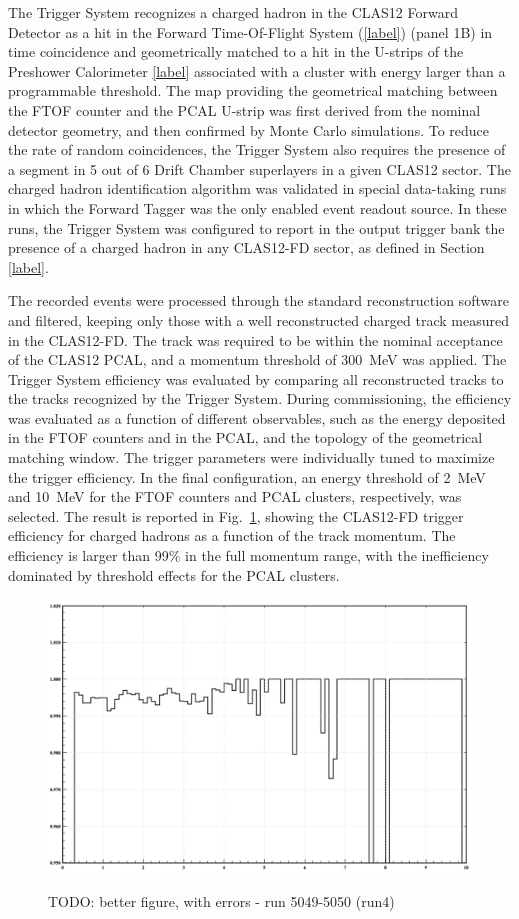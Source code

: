 The Trigger System recognizes a charged hadron in the CLAS12 Forward Detector as a hit in the Forward Time-Of-Flight System (\ref{label}) (panel 1B) in time coincidence and geometrically matched to a hit in the U-strips of the Preshower Calorimeter \ref{label} associated with a cluster with energy larger than a programmable threshold. The map providing the geometrical matching between the FTOF counter and the PCAL U-strip was first derived from the nominal detector geometry, and then confirmed by Monte Carlo simulations. To reduce the rate of random coincidences, the Trigger System also requires the presence of a segment in 5 out of 6 Drift Chamber superlayers in a given CLAS12 sector. The charged hadron identification algorithm was validated in special data-taking runs in which the Forward Tagger was the only enabled event readout source. In these runs, the Trigger System was configured to report in the output trigger bank the presence of a charged hadron in any CLAS12-FD sector, as defined in Section \ref{label}. 

The recorded events were processed through the standard reconstruction software and filtered, keeping only those with a well reconstructed charged track measured in the CLAS12-FD. The track was required to be within the nominal acceptance of the CLAS12 PCAL, and a momentum threshold of 300~MeV was applied. The Trigger System efficiency was evaluated by comparing all reconstructed tracks to the tracks recognized by the Trigger System. During commissioning, the efficiency was evaluated as a function of different observables, such as the energy deposited in the FTOF counters and in the PCAL, and the topology of the geometrical matching window. The trigger parameters were individually tuned to maximize the trigger efficiency. In the final configuration, an energy threshold of 2~MeV and 10~MeV for the FTOF counters and PCAL clusters, respectively, was selected. The result is reported in Fig.~\ref{fig:FD_TrackEfficiency}, showing the CLAS12-FD trigger efficiency for charged hadrons as a function of the track momentum. The efficiency is larger than 99$\%$ in the full momentum range, with the inefficiency dominated by threshold effects for the PCAL clusters.

\begin{figure}[!htb]
 \centering
{\includegraphics[width=.5\textwidth]{img/FD_TrackEfficiency.png}}
 \caption{TODO: better figure, with errors - run 5049-5050 (run4)}
 \label{fig:FD_TrackEfficiency}
\end{figure}
